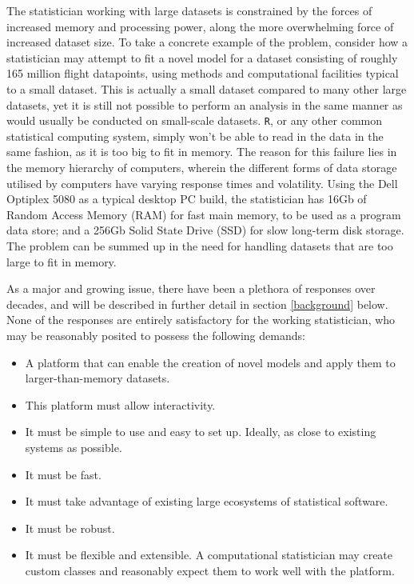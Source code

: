 \documentclass[a4paper,10pt]{article}
\begin{document}
The statistician working with large datasets is constrained by the forces of increased memory and processing power, along the more overwhelming force of increased dataset size.
To take a concrete example of the problem, consider how a statistician may attempt to fit a novel model for a dataset consisting of roughly 165 million flight datapoints\cite{bot2009flights}, using methods and computational facilities typical to a small dataset.
This is actually a small dataset compared to many other large datasets, yet it is still not possible to perform an analysis in the same manner as would usually be conducted on small-scale datasets.
\texttt{R}, or any other common statistical computing system, simply won't be able to read in the data in the same fashion, as it is too big to fit in memory.
The reason for this failure lies in the memory hierarchy of computers, wherein the different forms of data storage utilised by computers have varying response times and volatility.
Using the Dell Optiplex 5080 as a typical desktop PC build, the statistician has 16Gb of Random Access Memory (RAM) for fast main memory, to be used as a program data store; and a 256Gb Solid State Drive (SSD) for slow long-term disk storage\cite{cornell2021standardcomp}.
The problem can be summed up in the need for handling datasets that are too large to fit in memory.

As a major and growing issue, there have been a plethora of responses over decades, and will be described in further detail in section \ref{background} below.  
None of the responses are entirely satisfactory for the working statistician, who may be reasonably posited to possess the following demands:

\begin{itemize}
	\item A platform that can enable the creation of novel models and apply them to larger-than-memory datasets.
	\item This platform must allow interactivity.
	\item It must be simple to use and easy to set up.
		Ideally, as close to existing systems as possible.
	\item It must be fast.
	\item It must take advantage of existing large ecosystems of statistical software.
	\item It must be robust.
	\item It must be flexible and extensible.
		A computational statistician may create custom classes and reasonably expect them to work well with the platform.
\end{itemize}
\end{document}
